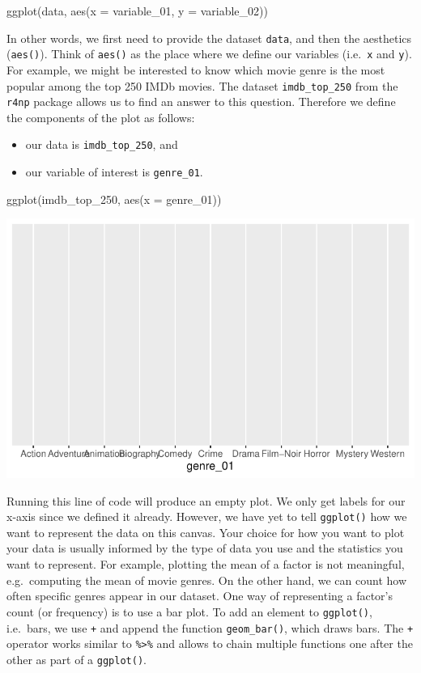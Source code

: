 \documentclass[
  letterpaper,
]{krantz}
\makeatletter
\newenvironment{Shaded}{\begin{snugshade}}{\end{snugshade}}
\newcommand{\AttributeTok}[1]{\textcolor[rgb]{0.40,0.45,0.13}{#1}}
\newcommand{\FunctionTok}[1]{\textcolor[rgb]{0.28,0.35,0.67}{#1}}
\newcommand{\NormalTok}[1]{\textcolor[rgb]{0.00,0.23,0.31}{#1}}
\newenvironment{kframe}{%
\medskip{}
\setlength{\fboxsep}{.8em}
 \def\at@end@of@kframe{}%
 \ifinner\ifhmode%
  \def\at@end@of@kframe{\end{minipage}}%
  \begin{minipage}{\columnwidth}%
 \fi\fi%
 \def\FrameCommand##1{\hskip\@totalleftmargin \hskip-\fboxsep
 \colorbox{shadecolor}{##1}\hskip-\fboxsep
     \hskip-\linewidth \hskip-\@totalleftmargin \hskip\columnwidth}%
 \MakeFramed {\advance\hsize-\width
   \@totalleftmargin\z@ \linewidth\hsize
   \@setminipage}}%
 {\par\unskip\endMakeFramed%
 \at@end@of@kframe}
\renewenvironment{Shaded}{\begin{kframe}}{\end{kframe}}
\makeatother
\begin{document}
\label{basic_ggplot_structure}
ggplot(data, aes(x = variable\_01, y = variable\_02))

In other words, we first need to provide the dataset \texttt{data}, and
then the aesthetics (\texttt{aes()}). Think of \texttt{aes()} as the
place where we define our variables (i.e.~\texttt{x} and \texttt{y}).
For example, we might be interested to know which movie genre is the
most popular among the top 250 IMDb movies. The dataset
\texttt{imdb\_top\_250} from the \texttt{r4np} package allows us to find
an answer to this question. Therefore we define the components of the
plot as follows:

\begin{itemize}
\item
  our data is \texttt{imdb\_top\_250}, and
\item
  our variable of interest is \texttt{genre\_01}.
\end{itemize}

\begin{Shaded}
\begin{Highlighting}[]
\FunctionTok{ggplot}\NormalTok{(imdb\_top\_250, }\FunctionTok{aes}\NormalTok{(}\AttributeTok{x =}\NormalTok{ genre\_01))}
\end{Highlighting}
\end{Shaded}

\includegraphics{08_descriptive_statistics_files/figure-pdf/most-popular-genre-incomplete-plot-1.pdf}

Running this line of code will produce an empty plot. We only get labels
for our x-axis since we defined it already. However, we have yet to tell
\texttt{ggplot()} how we want to represent the data on this canvas. Your
choice for how you want to plot your data is usually informed by the
type of data you use and the statistics you want to represent. For
example, plotting the mean of a factor is not meaningful, e.g.~computing
the mean of movie genres. On the other hand, we can count how often
specific genres appear in our dataset. One way of representing a
factor's count (or frequency) is to use a bar plot. To add an element to
\texttt{ggplot()}, i.e.~bars, we use \texttt{+} and append the function
\texttt{geom\_bar()}, which draws bars. The \texttt{+} operator works
similar to \texttt{\%\textgreater{}\%} and allows to chain multiple
functions one after the other as part of a \texttt{ggplot()}.
\end{document}
